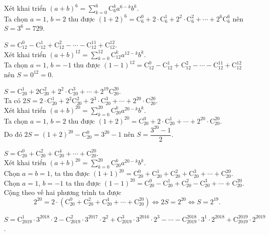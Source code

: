 \begin{bt}
{\begin{listEX}
			Xét khai triển $(a+b)^6=\displaystyle\sum\limits_{k=0}^6 \mathrm{C}_6^k a^{6-k}  b^k$.\\
			Ta chọn $a=1$, $b=2$ thu được $(1+2)^6=\mathrm{C}_6^0+2  \cdot \mathrm{C}_6^1+2^2 \cdot \mathrm{C}_6^2+\cdots+2^6 \mathrm{C}_6^6$ nên $S=3^6=729$.
			 \item $S=\mathrm{C}_{12}^0-\mathrm{C}_{12}^1+\mathrm{C}_{12}^2-\cdots-\mathrm{C}_{12}^{11}+\mathrm{C}_{12}^{12}$.\\
			 Xét khai triển $(a+b)^{12}=\displaystyle\sum\limits_{k=0}^{12} \mathrm{C}_{12}^k a^{12-k} b^k$.\\
			Ta chọn $a=1$, $b=-1$ thu được $(1-1)^{12}=\mathrm{C}_{12}^0-\mathrm{C}_{12}^1+\mathrm{C}_{12}^2-\cdots-\mathrm{C}_{12}^{11}+\mathrm{C}_{12}^{12}$ nên  $S=0^{12}=0$.
			\item $S=\mathrm{C}_{20}^1+2 \mathrm{C}_{20}^2+2^2  \cdot \mathrm{C}_{20}^3+\cdots+2^{19} \mathrm{C}_{20}^{20}$.\\
			Ta có $2 S=2 \cdot \mathrm{C}_{20}^1+2^2 \mathrm{C}_{20}^2+2^3 \cdot  \mathrm{C}_{20}^3+\cdots+2^{20} \cdot \mathrm{C}_{20}^{20}$.\\
			Xét khai triển $(a+b)^{20}=\displaystyle\sum\limits_{k=0}^{20} \mathrm{C}_{20}^k a^{20-k} b^k$.\\ 
			Ta chọn $a=1$, $b=2$ thu được  $(1+2)^{20}=\mathrm{C}_{20}^0+2 \cdot \mathrm{C}_{20}^1+\cdots+2^{20} \cdot \mathrm{C}_{20}^{20}$.\\
			Do đó  $2 S=(1+2)^{20}-\mathrm{C}_{20}^0=3^{20}-1$ nên $S=\dfrac{3^{20}-1}{2}$.
			\item  $S=\mathrm{C}_{20}^0+\mathrm{C}_{20}^2+\mathrm{C}_{20}^4+\cdots+\mathrm{C}_{20}^{20}$.\\
			Xét khai triển $(a+b)^{20}=\displaystyle\sum\limits_{k=0}^{20}  \mathrm{C}_{20}^k a^{20-k} b^k$.\\
			 Chọn $a=b=1$, ta thu được $(1+1)^{20}=\mathrm{C}_{20}^0+\mathrm{C}_{20}^1+\mathrm{C}_{20}^2+\mathrm{C}_{20}^3 +\cdots+\mathrm{C}_{20}^{20}$.\\
			Chọn  $a=1$, $b=-1$ ta thu được $(1-1)^{20}=\mathrm{C}_{20}^0-\mathrm{C}_{20}^1+\mathrm{C}_{20}^2-\mathrm{C}_{20}^3+\cdots+\mathrm{C}_{20}^{20}$.\\
			Cộng theo vế  hai phương trình ta được
			$$2^{20}=2 \cdot\left(\mathrm{C}_{20}^0+\mathrm{C}_{20}^2+\mathrm{C}_{20}^4+\cdots+\mathrm{C}_{20}^{20}\right) \Leftrightarrow 2 S=2^{20}  \Leftrightarrow S=2^{19}.$$
			\item $S=\mathrm{C}_{2019}^1 \cdot 3^{2018} \cdot  2-\mathrm{C}_{2019}^2 \cdot 3^{2017} \cdot 2^2+\mathrm{C}_{2019}^3 \cdot 3^{2016} \cdot 2^3-\cdots-\mathrm{C}_{2019}^{2018} \cdot 3^1 \cdot 2^{2018}+\mathrm{C}_{2019}^{2019} \cdot 2^{2019}$.\\

\end{listEX}}
\end{bt}
